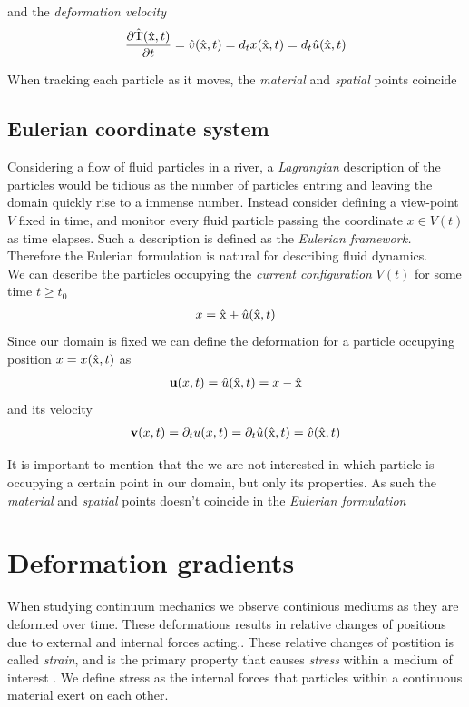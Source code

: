 and the \textit{deformation velocity}
\begin{align}
\frac{\partial \text{\^{T}}(\text{\^{x}}, t)}{\partial t} = \hat{v}(\text{\^{x}},t) = d_t x(\text{\^{x}},t) = d_t \hat{u}(\text{\^{x}},t) 
\end{align}

When tracking each particle as it moves, the \textit{material} and \textit{spatial} points coincide

\subsection{Eulerian coordinate system}
Considering a flow of fluid particles in a river, a \textit{Lagrangian} description of the particles would be tidious as the number of particles entring and leaving the domain quickly rise to a immense number. 
Instead consider defining a view-point $V$ fixed in time, and monitor every fluid particle passing the coordinate $x \in V(t)$ as time elapses. Such a description is defined as the \textit{Eulerian framework.} 
Therefore the Eulerian formulation is natural for describing fluid dynamics. \\
We can describe the particles occupying the \textit{current configuration} $V(t)$ for some time $t \geq t_0$ 
\begin{align*}
x = \text{\^{x}} + \hat{u}(\text{\^{x}}, t)	
\end{align*}
Since our domain is fixed we can define the deformation for a particle 
occupying position $x = x(\text{\^{x}},t)$ as
\begin{align*}
\textbf{u}(x, t) = \hat{u}(\text{\^{x}}, t) = x - \text{\^{x}}	\\
\end{align*}
and its velocity
\begin{align*}
\textbf{v}(x,t) = \partial_t u(x,t) = \partial_t \hat{u}(\text{\^{x}},t) = \hat{v}(\text{\^{x}},t)
\end{align*}

It is important to mention that the we are not interested in which particle is occupying a certain point in our domain, but only its properties. As such the \textit{material} and \textit{spatial} points doesn't coincide in the \textit{Eulerian formulation}


\section{Deformation gradients}
When studying continuum mechanics we observe continious mediums as they are deformed over time. These deformations
results in relative changes of positions due to external and internal forces acting.. These relative changes of postition is called
\textit{strain}, and is the primary property that causes \textit{stress} within a medium of interest \cite{Richter2016}. We define stress as the internal forces that particles within a continuous material exert on each other. \\

